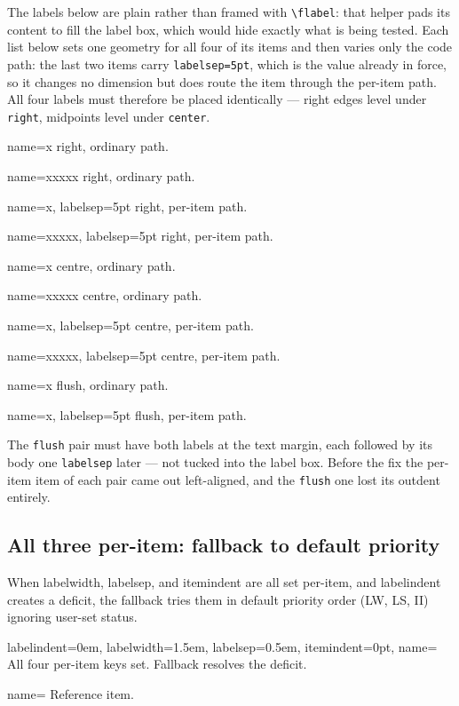 \documentclass{article}
\newlength{\flabelwd}
\newcommand{\flabel}[1]{%
  \settowidth{\flabelwd}{\textbf{#1}}%
  \ifdim\flabelwd<\dimexpr\labelwidth-2\fboxsep-2\fboxrule\relax
    \setlength{\flabelwd}{\dimexpr\labelwidth-2\fboxsep-2\fboxrule\relax}%
  \fi
  \fbox{\makebox[\flabelwd]{\textbf{#1}\hfill}}}
\begin{document}
The labels below are plain rather than framed with \verb|\flabel|: that helper
pads its content to fill the label box, which would hide exactly what is being
tested.  Each list below sets one geometry for all four of its items and then varies
only the code path: the last two items carry \texttt{labelsep=5pt}, which is
the value already in force, so it changes no dimension but does route the item
through the per-item path.  All four labels must therefore be placed
identically --- right edges level under \texttt{right}, midpoints level under
\texttt{center}.

\begin{prop}[align=right, labelwidth=4em]
  \item[name=x] right, ordinary path.
  \item[name=xxxxx] right, ordinary path.
  \item[name=x, labelsep=5pt] right, per-item path.
  \item[name=xxxxx, labelsep=5pt] right, per-item path.
\end{prop}

\begin{prop}[align=center, labelwidth=4em]
  \item[name=x] centre, ordinary path.
  \item[name=xxxxx] centre, ordinary path.
  \item[name=x, labelsep=5pt] centre, per-item path.
  \item[name=xxxxx, labelsep=5pt] centre, per-item path.
\end{prop}

\begin{prop}[align=flush, labelwidth=4em]
  \item[name=x] flush, ordinary path.
  \item[name=x, labelsep=5pt] flush, per-item path.
\end{prop}

The \texttt{flush} pair must have both labels at the text margin, each followed
by its body one \texttt{labelsep} later --- not tucked into the label box.
Before the fix the per-item item of each pair came out left-aligned, and the
\texttt{flush} one lost its outdent entirely.

\subsection{All three per-item: fallback to default priority}

When labelwidth, labelsep, and itemindent are all set per-item, and
labelindent creates a deficit, the fallback tries them in default
priority order (LW, LS, II) ignoring user-set status.

\begin{prop}
  \item[labelindent=0em, labelwidth=1.5em, labelsep=0.5em,
         itemindent=0pt, name=\flabel{All}]
    All four per-item keys set.  Fallback resolves the deficit.
  \item[name=\flabel{Ref}] Reference item.
\end{prop}
\end{document}
